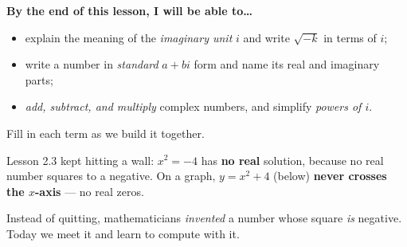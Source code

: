 \documentclass[10pt]{article}
\newcommand{\lgrid}[4]{%
  \draw[step=1, linegray!40, very thin] (#1,#3) grid (#2,#4);
  \draw[->, semithick, charcoal] (#1,0)--(#2,0) node[below right, font=\scriptsize]{$x$};
  \draw[->, semithick, charcoal] (0,#3)--(0,#4) node[left, font=\scriptsize]{$y$};}
\begin{document}

\vspace{0.10in}

\begin{objectivebox}
\textbf{By the end of this lesson, I will be able to\dots}
\begin{itemize}\setlength{\itemsep}{2pt}
  \item explain the meaning of the \emph{imaginary unit} $i$ and write $\sqrt{-k}$ in terms of $i$;
  \item write a number in \emph{standard} $a+bi$ form and name its real and imaginary parts;
  \item \emph{add, subtract, and multiply} complex numbers, and simplify \emph{powers of $i$}.
\end{itemize}
\end{objectivebox}

\vspace{0.06in}

\begin{vocabbox}
\small
Fill in each term as we build it together.
\par\vspace{2pt}
\end{vocabbox}

\begin{hookbox}
Lesson 2.3 kept hitting a wall: $x^2=-4$ has \textbf{no real} solution, because no real number squares
to a negative. On a graph, $y=x^2+4$ (below) \textbf{never crosses the $x$-axis} --- no real zeros.
\begin{center}
\end{center}
\vspace{-4pt}
Instead of quitting, mathematicians \emph{invented} a number whose square \emph{is} negative. Today we
meet it and learn to compute with it.
\end{hookbox}
\end{document}
